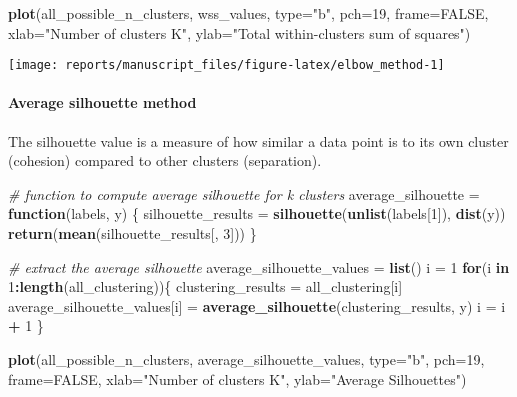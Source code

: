 \documentclass[9pt,a4paper,]{extarticle}
\newenvironment{Shaded}{\begin{snugshade}}{\end{snugshade}}
\newcommand{\CommentTok}[1]{\textcolor[rgb]{0.56,0.35,0.01}{\textit{#1}}}
\newcommand{\ControlFlowTok}[1]{\textcolor[rgb]{0.13,0.29,0.53}{\textbf{#1}}}
\newcommand{\DataTypeTok}[1]{\textcolor[rgb]{0.13,0.29,0.53}{#1}}
\newcommand{\DecValTok}[1]{\textcolor[rgb]{0.00,0.00,0.81}{#1}}
\newcommand{\KeywordTok}[1]{\textcolor[rgb]{0.13,0.29,0.53}{\textbf{#1}}}
\newcommand{\NormalTok}[1]{#1}
\newcommand{\OperatorTok}[1]{\textcolor[rgb]{0.81,0.36,0.00}{\textbf{#1}}}
\newcommand{\OtherTok}[1]{\textcolor[rgb]{0.56,0.35,0.01}{#1}}
\newcommand{\StringTok}[1]{\textcolor[rgb]{0.31,0.60,0.02}{#1}}
\begin{document}
\begin{Shaded}
\begin{Highlighting}[]
\KeywordTok{plot}\NormalTok{(all_possible_n_clusters, wss_values,}
     \DataTypeTok{type=}\StringTok{"b"}\NormalTok{, }\DataTypeTok{pch=}\DecValTok{19}\NormalTok{, }\DataTypeTok{frame=}\OtherTok{FALSE}\NormalTok{, }
     \DataTypeTok{xlab=}\StringTok{"Number of clusters K"}\NormalTok{,}
     \DataTypeTok{ylab=}\StringTok{"Total within-clusters sum of squares"}\NormalTok{)}
\end{Highlighting}
\end{Shaded}

\begin{center}\texttt{[image: reports/manuscript\_files/figure-latex/elbow\_method-1]} \end{center}

\hypertarget{average-silhouette-method}{%
\paragraph{Average silhouette method}\label{average-silhouette-method}}

The silhouette value is a measure of how similar a data point is to its own
cluster (cohesion) compared to other clusters (separation).

\begin{Shaded}
\begin{Highlighting}[]
\CommentTok{# function to compute average silhouette for k clusters}
\NormalTok{average_silhouette =}\StringTok{ }\ControlFlowTok{function}\NormalTok{(labels, y) \{}
\NormalTok{    silhouette_results =}\StringTok{ }\KeywordTok{silhouette}\NormalTok{(}\KeywordTok{unlist}\NormalTok{(labels[}\DecValTok{1}\NormalTok{]), }\KeywordTok{dist}\NormalTok{(y))}
    \KeywordTok{return}\NormalTok{(}\KeywordTok{mean}\NormalTok{(silhouette_results[, }\DecValTok{3}\NormalTok{]))}
\NormalTok{\}}

\CommentTok{# extract the average silhouette}
\NormalTok{average_silhouette_values =}\StringTok{ }\KeywordTok{list}\NormalTok{()}
\NormalTok{i =}\StringTok{ }\DecValTok{1}
\ControlFlowTok{for}\NormalTok{(i }\ControlFlowTok{in} \DecValTok{1}\OperatorTok{:}\KeywordTok{length}\NormalTok{(all_clustering))\{}
\NormalTok{    clustering_results =}\StringTok{ }\NormalTok{all_clustering[i]}
\NormalTok{    average_silhouette_values[i] =}\StringTok{ }\KeywordTok{average_silhouette}\NormalTok{(clustering_results, y)}
\NormalTok{    i =}\StringTok{ }\NormalTok{i }\OperatorTok{+}\StringTok{ }\DecValTok{1}
\NormalTok{\}}

\KeywordTok{plot}\NormalTok{(all_possible_n_clusters, average_silhouette_values,}
     \DataTypeTok{type=}\StringTok{"b"}\NormalTok{, }\DataTypeTok{pch=}\DecValTok{19}\NormalTok{, }\DataTypeTok{frame=}\OtherTok{FALSE}\NormalTok{,}
     \DataTypeTok{xlab=}\StringTok{"Number of clusters K"}\NormalTok{,}
     \DataTypeTok{ylab=}\StringTok{"Average Silhouettes"}\NormalTok{)}
\end{Highlighting}
\end{Shaded}
\end{document}
